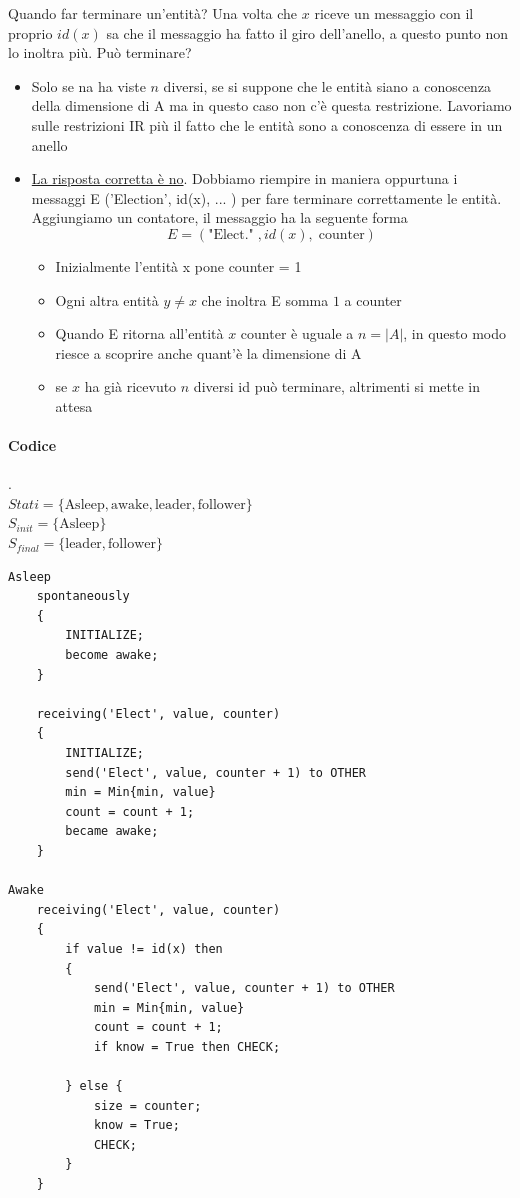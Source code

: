 Quando far terminare un'entità? Una volta che $x$ riceve un messaggio con il proprio $id(x)$ sa che il messaggio ha fatto il giro dell'anello, a questo punto non lo inoltra più. Può terminare?
\begin{itemize}
    \item Solo se na ha viste $n$ diversi, se si suppone che le entità siano a conoscenza della dimensione di A ma in questo caso non c'è questa restrizione. Lavoriamo sulle restrizioni IR più il fatto che le entità sono a conoscenza di essere in un anello
    \item \uline{La risposta corretta è no}. Dobbiamo riempire in maniera oppurtuna i messaggi E ('Election', id(x), ... ) per fare terminare correttamente le entità. Aggiungiamo un contatore, il messaggio ha la seguente forma
    \[E = (\text{"Elect."}\;, id(x), \;\text{counter})\]
    \begin{itemize}
        \item Inizialmente l'entità x pone counter = 1
        \item Ogni altra entità $y \neq x$ che inoltra E somma $1$ a counter
        \item Quando E ritorna all'entità $x$ counter è uguale a $n = |A|$, in questo modo riesce a scoprire anche quant'è la dimensione di A
        \item se $x$ ha già ricevuto $n$ diversi id può terminare, altrimenti si mette in attesa
    \end{itemize}
\end{itemize}

\paragraph{Codice}
.\\$Stati = \{\text{Asleep}, \text{awake}, \text{leader}, \text{follower}\}$\\
$S_{init} = \{\text{Asleep}\}$\\
$S_{final} = \{\text{leader}, \text{follower}\}$

\begin{lstlisting}
Asleep
    spontaneously
    {
        INITIALIZE;
        become awake;
    }

    receiving('Elect', value, counter)
    {
        INITIALIZE;
        send('Elect', value, counter + 1) to OTHER
        min = Min{min, value}
        count = count + 1; 
        became awake;
    }

Awake
    receiving('Elect', value, counter)
    {
        if value != id(x) then
        {
            send('Elect', value, counter + 1) to OTHER
            min = Min{min, value}
            count = count + 1; 
            if know = True then CHECK;
            
        } else {
            size = counter;
            know = True;
            CHECK;
        }
    }
\end{lstlisting}

